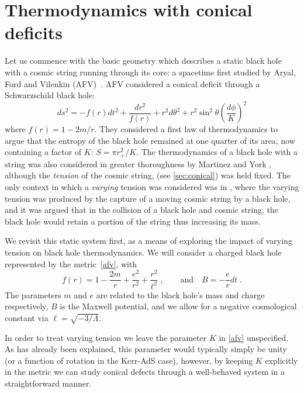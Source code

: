 \documentclass[
twoside,
openright,
frontopenright,
]{dmathesis}
\begin{document}
\section{Thermodynamics with conical deficits}\label{sec:singlemu}

Let us commence with the basic geometry which describes a static black hole with
a cosmic string running through its core: a spacetime first studied by Aryal,
Ford and Vilenkin (AFV)~\cite{Aryal:1986sz}. AFV considered a conical deficit
through a Schwarzschild black hole:
\begin{equation}
ds^2 = - f(r) dt^2 + \frac{dr^2}{f(r)} + r^2 d\theta^2
+ r^2 \sin^2\theta \left (\frac{d\phi}{K}\right ) ^2
\label{afv}
\end{equation}
where $f(r) = 1 -2m/r$. They considered a first law of thermodynamics to argue
that the entropy of the black hole remained at one quarter of its area, now
containing a factor of $K$: $S = \pi r_+^2/K$. The thermodynamics of a black
hole with a string was also considered in greater thoroughness by Martinez and
York \cite{Martinez:1990sd}, although the \emph{tension} of the cosmic string,
(see \cref{sec:conical}) was held fixed. The only context in which a
\emph{varying} tension was considered was in \cite{Bonjour:1998rf}, where the
varying tension was produced by the capture of a moving cosmic string by a black
hole, and it was argued that in the collision of a black hole and cosmic string,
the black hole would retain a portion of the string thus increasing its mass.

We revisit this static system first, as a means of exploring the impact of
varying tension on black hole thermodynamics. We will consider a charged black
hole represented by the metric~\eqref{afv}, with
\begin{equation}
f(r) = 1-\frac{2m}{r} + \frac{e^{2}}{r^{2}} + \frac{r^{2}}{\ell^2}\;, \qquad
\text{and} \quad {B} = - \frac{e}{r} dt\;.
\end{equation}
The parameters $m$ and $e$ are related to the black hole's mass and charge
respectively, $B$ is the Maxwell potential, and we allow for a negative
cosmological constant via $\ell = \sqrt{-3/\Lambda}$.

In order to treat varying tension we leave the parameter $K$ in \cref{afv}
unspecified. As has already been explained, this parameter would typically
simply be unity (or a function of rotation in the Kerr-AdS case), however, by
keeping $K$ explicitly in the metric we can study conical defects through a
well-behaved system in a straightforward manner.
\end{document}
